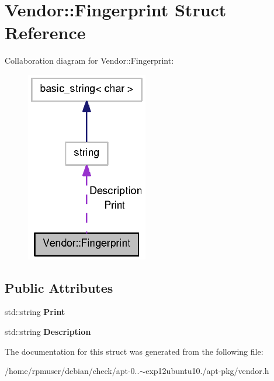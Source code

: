 \section{\-Vendor\-:\-:\-Fingerprint \-Struct \-Reference}
\label{structVendor_1_1Fingerprint}


\-Collaboration diagram for \-Vendor\-:\-:\-Fingerprint\-:
\nopagebreak
\begin{figure}[H]
\begin{center}
\leavevmode
\includegraphics[width=151pt]{structVendor_1_1Fingerprint__coll__graph}
\end{center}
\end{figure}
\subsection*{\-Public \-Attributes}
\begin{DoxyCompactItemize}
\item 
std\-::string {\bfseries \-Print}\label{structVendor_1_1Fingerprint_ab15473024f5be405e0c5fddf385999b8}

\item 
std\-::string {\bfseries \-Description}\label{structVendor_1_1Fingerprint_a72a1a381861908396ddca53a1fa28f97}

\end{DoxyCompactItemize}


\-The documentation for this struct was generated from the following file\-:\begin{DoxyCompactItemize}
\item 
/home/rpmuser/debian/check/apt-\/0..$\sim$exp12ubuntu10./apt-\/pkg/vendor.\-h\end{DoxyCompactItemize}
